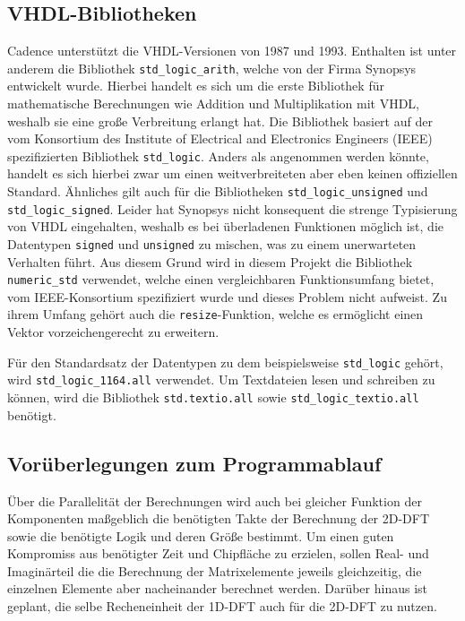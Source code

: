  \subsection{VHDL-Bibliotheken}
 Cadence unterstützt die VHDL-Versionen von 1987 und 1993. 
 Enthalten ist unter anderem die Bibliothek \texttt{std\_logic\_arith}, welche von der Firma Synopsys entwickelt wurde. Hierbei handelt es sich um die erste Bibliothek
 für mathematische Berechnungen wie Addition und Multiplikation mit VHDL, weshalb sie eine große Verbreitung erlangt hat.
 Die Bibliothek basiert auf der vom Konsortium des Institute of Electrical and Electronics Engineers (IEEE) spezifizierten Bibliothek \texttt{std\_logic}. Anders als angenommen werden könnte, handelt es sich hierbei zwar um einen weitverbreiteten aber eben keinen offiziellen Standard.
 Ähnliches gilt auch für die Bibliotheken \texttt{std\_logic\_unsigned} und \texttt{std\_logic\_signed}.
 Leider hat Synopsys nicht konsequent die strenge Typisierung von VHDL eingehalten, weshalb es bei überladenen Funktionen möglich ist, die Datentypen \texttt{signed} und \texttt{unsigned} zu mischen, was zu einem unerwarteten Verhalten führt.
 Aus diesem Grund wird in diesem Projekt die Bibliothek \texttt{numeric\_std} verwendet, welche einen vergleichbaren Funktionsumfang bietet, vom IEEE-Konsortium spezifiziert wurde und dieses Problem nicht aufweist. Zu ihrem 
 Umfang gehört auch die \texttt{resize}-Funktion, welche es ermöglicht einen Vektor vorzeichengerecht zu erweitern.
 
Für den Standardsatz der Datentypen zu dem beispielsweise \texttt{std\_logic} gehört, wird 
\texttt{std\_logic\_1164.all} verwendet.
Um Textdateien lesen und schreiben zu können, wird die Bibliothek \texttt{std.textio.all} sowie 
\texttt{std\_logic\_textio.all} benötigt.

 
\subsection{Vorüberlegungen zum Programmablauf}\label{sec:VorueberlegungenProgrammablauf}
Über die Parallelität der Berechnungen wird auch bei gleicher Funktion der Komponenten maßgeblich die benötigten Takte der Berechnung der 2D-DFT sowie die benötigte
Logik und deren Größe bestimmt. 
Um einen guten Kompromiss aus benötigter Zeit und Chipfläche zu erzielen,
sollen  Real- und Imaginärteil die die Berechnung der Matrixelemente jeweils gleichzeitig, die einzelnen Elemente aber nacheinander berechnet werden. Darüber hinaus ist geplant, die selbe Recheneinheit der 1D-DFT auch für die 2D-DFT zu nutzen. 


